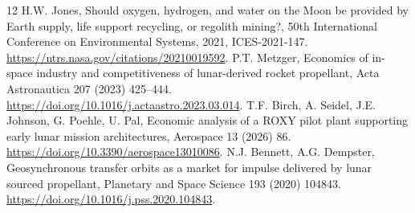 \documentclass[final,5p,times,twocolumn]{elsarticle}
\begin{document}
\begin{thebibliography}{12}
 H.W. Jones, Should oxygen, hydrogen, and water on the Moon be provided by Earth supply, life support recycling, or regolith mining?, 50th International Conference on Environmental Systems, 2021, ICES-2021-147. \url{https://ntrs.nasa.gov/citations/20210019592}.
 P.T. Metzger, Economics of in-space industry and competitiveness of lunar-derived rocket propellant, Acta Astronautica 207 (2023) 425--444. \url{https://doi.org/10.1016/j.actaastro.2023.03.014}.
 T.F. Birch, A. Seidel, J.E. Johnson, G. Poehle, U. Pal, Economic analysis of a ROXY pilot plant supporting early lunar mission architectures, Aerospace 13 (2026) 86. \url{https://doi.org/10.3390/aerospace13010086}.
 N.J. Bennett, A.G. Dempster, Geosynchronous transfer orbits as a market for impulse delivered by lunar sourced propellant, Planetary and Space Science 193 (2020) 104843. \url{https://doi.org/10.1016/j.pss.2020.104843}.
\end{thebibliography}
\end{document}
